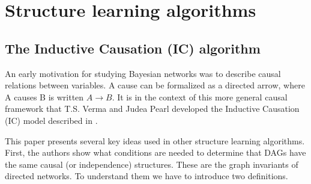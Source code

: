 


\chapter{Structure learning algorithms}



  \section{The Inductive Causation (IC) algorithm}

    
    An early motivation for studying Bayesian networks was
    to describe causal relations between variables. 
     A cause can be formalized as a directed
    arrow, where A causes B is written $A \rightarrow
    B$. It is in the context of this more general 
    causal framework that T.S. Verma and Judea 
    Pearl developed the Inductive Causation (IC) model
    described in \cite{Verma}. 

    This paper presents
    several key ideas used in other structure learning
    algorithms. First, the authors show what 
    conditions are needed to determine
    that DAGs have the same causal (or independence)
    structures. These are the graph invariants of directed
    networks. To understand them we have to introduce 
    two definitions. 

